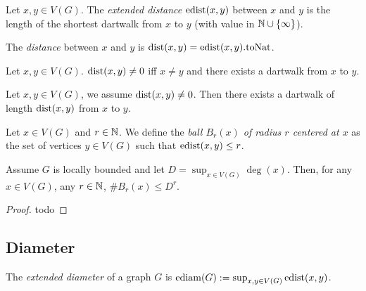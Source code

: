\begin{definition}
  \label{def:edistance}
  \leanok
  Let $x, y \in V(G)$. The \emph{extended distance} $\mathrm{edist}(x,y)$
  between $x$ and $y$
  is the length of the shortest dartwalk from $x$ to $y$ (with value in
  $\mathbb{N} \cup \{\infty\}$).
\end{definition}

\begin{definition}
  \label{def:distance}
  The \emph{distance} between $x$ and $y$
  is $\mathrm{dist}(x,y) = \mathrm{edist}(x,y).\mathrm{toNat}$.
\end{definition}

\begin{lemma}
  \label{lem:distance_ne_zero}
  Let $x, y \in V(G)$. $\mathrm{dist}(x,y) \neq 0$ iff $x \neq y$ and there exists
  a dartwalk from $x$ to $y$.
\end{lemma}

\begin{lemma}
  \label{lem:distance_take}
  Let $x, y \in V(G)$, we assume $\mathrm{dist}(x,y) \neq 0$. Then there exists a dartwalk
  of length $\mathrm{dist}(x,y)$ from $x$ to $y$.
\end{lemma}

\begin{definition}
  \label{def:ball}
  Let $x \in V(G)$ and $r \in \mathbb{N}$.
  We define the \emph{ball $B_r(x)$
  of radius $r$ centered at $x$} as the set of vertices
  $y \in V(G)$ such that $\mathrm{edist}(x,y)\leq r$.
\end{definition}

\begin{proposition}
  \label{prop:growth_ball}
  Assume $G$ is locally bounded and let $D = \sup_{x \in V(G)} \deg (x)$.
  Then, for any $x \in V(G)$, any $r \in \mathbb{N}$,
  $\# B_r(x) \leq D^r$.
\end{proposition}

\begin{proof}
  todo
\end{proof}

\subsection{Diameter}

\begin{definition}
  \label{def:ediameter}
  The \emph{extended diameter} of a graph $G$ is
  $\mathrm{ediam}(G) := \sup_{x,y \in V(G)} \mathrm{edist}(x,y)$.
\end{definition}


